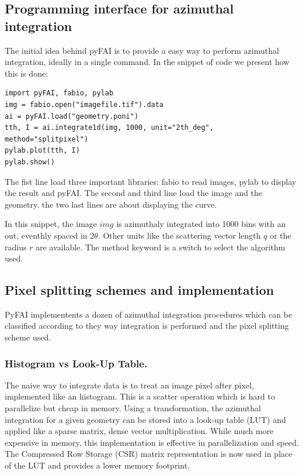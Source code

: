 \documentclass[preprint]{iucr}
\begin{document}
\subsection{Programming interface for azimuthal integration}

The initial idea behind pyFAI is to provide a easy way to perform azimuthal
integration, ideally in a single command. In the snippet of code we present how
this is done:

\begin{verbatim}
import pyFAI, fabio, pylab
img = fabio.open("imagefile.tif").data
ai = pyFAI.load("geometry.poni")
tth, I = ai.integrate1d(img, 1000, unit="2th_deg", method="splitpixel")
pylab.plot(tth, I)
pylab.show()
\end{verbatim}

The fist line load three important libraries: fabio \cite{fabio} to read
images, pylab \cite{matplotlib} to display the result and pyFAI.
The second and third line load the image and the geometry.
the two last lines are about displaying the curve.

In this snippet, the image $img$ is azimuthaly integrated into 1000 bins with an
out, eventhly spaced in $2\theta$. Other units like the scattering vector length
$q$ or the radius $r$ are available.
The method keyword is a switch to select the algorithm used.

\subsection{Pixel splitting schemes and implementation}

PyFAI implementents a dozen of azimuthal integration procedures which can be
classified according to they way integration is performed and the pixel
splitting scheme used.

\subsubsection{Histogram vs Look-Up Table.} 
The naive way to integrate data is to treat an image pixel after pixel, 
implemented like an histogram. This is a scatter operation which is hard to
parallelize but cheap in memory.
Using a  transformation, the azimuthal integration for
a given geometry can be stored into a look-up table (LUT) and applied like a
sparse matrix, dense vector multiplication. 
While much more expensive in memory, this
implementation is effective in parallelization and speed. 
The Compressed Row Storage (CSR) matrix representation is now used in place of
the LUT and provides a lower memory footprint.
\end{document}
